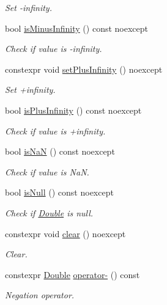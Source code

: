 \begin{DoxyCompactItemize}
\begin{DoxyCompactList}\small\item\em Set -\/infinity. \end{DoxyCompactList}\item 
bool \hyperlink{class_mdt_1_1_numeric_1_1_double_a08fc926a071bfcda66e86b0081825b44}{is\+Minus\+Infinity} () const noexcept
\begin{DoxyCompactList}\small\item\em Check if value is -\/infinity. \end{DoxyCompactList}\item 
constexpr void \hyperlink{class_mdt_1_1_numeric_1_1_double_a922f39ec2ee308c7c86471252a22a28c}{set\+Plus\+Infinity} () noexcept
\begin{DoxyCompactList}\small\item\em Set +infinity. \end{DoxyCompactList}\item 
bool \hyperlink{class_mdt_1_1_numeric_1_1_double_aff0038f2052e0942cd7544097ccbe40a}{is\+Plus\+Infinity} () const noexcept
\begin{DoxyCompactList}\small\item\em Check if value is +infinity. \end{DoxyCompactList}\item 
bool \hyperlink{class_mdt_1_1_numeric_1_1_double_a2cc3d131c3558fc7d6b494c439e2f826}{is\+NaN} () const noexcept
\begin{DoxyCompactList}\small\item\em Check if value is NaN. \end{DoxyCompactList}\item 
bool \hyperlink{class_mdt_1_1_numeric_1_1_double_a01d4bfdb780a56d84fa07f48282aa254}{is\+Null} () const noexcept
\begin{DoxyCompactList}\small\item\em Check if \hyperlink{class_mdt_1_1_numeric_1_1_double}{Double} is null. \end{DoxyCompactList}\item 
constexpr void \hyperlink{class_mdt_1_1_numeric_1_1_double_a0306258c3934f174cbe9826f129e705a}{clear} () noexcept
\begin{DoxyCompactList}\small\item\em Clear. \end{DoxyCompactList}\item 
constexpr \hyperlink{class_mdt_1_1_numeric_1_1_double}{Double} \hyperlink{class_mdt_1_1_numeric_1_1_double_a833b6f2ba91fee3158b2e5eba5a978dc}{operator-\/} () const 
\begin{DoxyCompactList}\small\item\em Negation operator. \end{DoxyCompactList}\end{DoxyCompactItemize}
